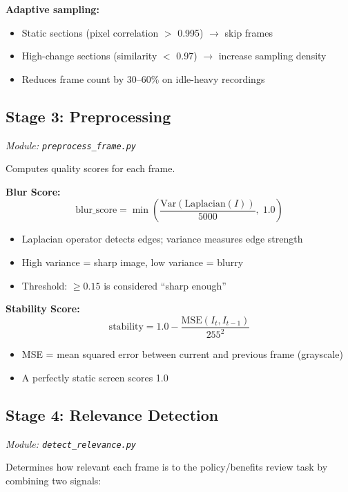 \documentclass[12pt, a4paper]{article}
\newcommand{\filepath}[1]{\texttt{\small #1}}
\begin{document}
\textbf{Adaptive sampling:}
\begin{itemize}
    \item Static sections (pixel correlation $>$ 0.995) $\rightarrow$ skip frames
    \item High-change sections (similarity $<$ 0.97) $\rightarrow$ increase sampling density
    \item Reduces frame count by 30--60\% on idle-heavy recordings
\end{itemize}

\subsection{Stage 3: Preprocessing}
\textit{Module: \filepath{preprocess\_frame.py}}

Computes quality scores for each frame.

\textbf{Blur Score:}
\begin{equation}
    \text{blur\_score} = \min\!\left(\frac{\text{Var}(\text{Laplacian}(I))}{5000},\; 1.0\right)
\end{equation}

\begin{itemize}
    \item Laplacian operator detects edges; variance measures edge strength
    \item High variance = sharp image, low variance = blurry
    \item Threshold: $\geq 0.15$ is considered ``sharp enough''
\end{itemize}

\textbf{Stability Score:}
\begin{equation}
    \text{stability} = 1.0 - \frac{\text{MSE}(I_t, I_{t-1})}{255^2}
\end{equation}

\begin{itemize}
    \item MSE = mean squared error between current and previous frame (grayscale)
    \item A perfectly static screen scores 1.0
\end{itemize}

\subsection{Stage 4: Relevance Detection}
\textit{Module: \filepath{detect\_relevance.py}}

Determines how relevant each frame is to the policy/benefits review task by combining two signals:
\end{document}
